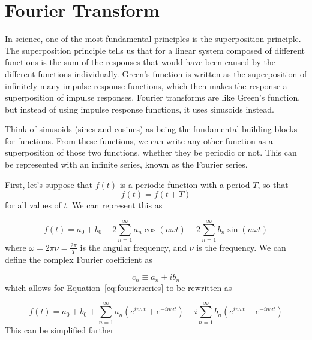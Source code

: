         \section{Fourier Transform}

        In science, one of the most fundamental principles is the superposition
        principle. The superposition principle tells us that for a linear system
        composed of different functions is the sum of the responses that would have
        been caused by the different functions individually. Green's function is
        written as the
        superposition of infinitely many impulse response functions, which then makes
        the response a superposition of impulse responses. Fourier transforms are like
        Green's function, but instead of using impulse response functions, it uses
        sinusoids instead.

        Think of sinusoids (sines and cosines) as being the fundamental building blocks
        for functions. From these functions, we can write any other function as a
        superposition of those two functions, whether they be periodic or not. This can
        be represented with an infinite series, known as the Fourier series.

        First, let's suppose that $f(t)$ is a periodic function with a period
        $T$, so that
        \begin{equation}
            f(t)=f(t+T)
        \end{equation}
        for all values of $t$. We can represent this as

        \begin{equation}
            f(t) = a_0 + b_0 + 2\sum_{n=1}^{\infty} a_n \cos(n\omega
            t)+2\sum_{n=1}^{\infty}b_n\sin(n\omega t)
            \label{eq:fourierseries}
        \end{equation}
        where $\omega=2\pi\nu=\frac{2\pi}{T}$ is the angular frequency, and $\nu$ is the frequency.
        We can define the complex Fourier coefficient as

        \begin{equation}
            c_n \equiv a_n+ib_n
        \end{equation}
        which allows for Equation~\ref{eq:fourierseries} to be rewritten as

        \begin{equation}
            f(t) = a_0 + b_0 +\sum_{n=1}^{\infty} a_n \left( e^{in\omega t} +
            e^{-in\omega t} \right) - i\sum_{n=1}^{\infty} b_n \left( e^{in\omega t} -
            e^{-in\omega t} \right)
        \end{equation}
        This can be simplified farther

